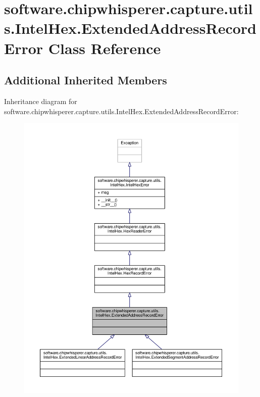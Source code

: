 \hypertarget{classsoftware_1_1chipwhisperer_1_1capture_1_1utils_1_1IntelHex_1_1ExtendedAddressRecordError}{}\section{software.\+chipwhisperer.\+capture.\+utils.\+Intel\+Hex.\+Extended\+Address\+Record\+Error Class Reference}
\label{classsoftware_1_1chipwhisperer_1_1capture_1_1utils_1_1IntelHex_1_1ExtendedAddressRecordError}
\subsection*{Additional Inherited Members}


Inheritance diagram for software.\+chipwhisperer.\+capture.\+utils.\+Intel\+Hex.\+Extended\+Address\+Record\+Error\+:\nopagebreak
\begin{figure}[H]
\begin{center}
\leavevmode
\includegraphics[width=350pt]{d9/d51/classsoftware_1_1chipwhisperer_1_1capture_1_1utils_1_1IntelHex_1_1ExtendedAddressRecordError__inherit__graph}
\end{center}
\end{figure}


